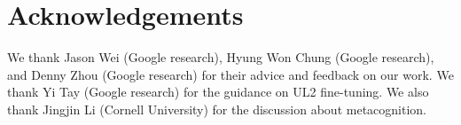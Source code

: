 \section*{Acknowledgements}
\label{sec:acknowledgements}
We thank Jason Wei (Google research), Hyung Won Chung (Google research), and Denny Zhou (Google research) for their advice and feedback on our work. We thank Yi Tay (Google research) for the guidance on UL2 fine-tuning. We also thank Jingjin Li (Cornell University) for the discussion about metacognition.